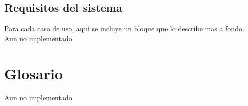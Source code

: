 \documentclass[a4paper, spanish]{article}
\begin{document}
\subsection{Requisitos del sistema}
Para cada caso de uso, aqui se incluye un bloque que lo describe mas a fondo.
\newcommand{\CasoDeUso}[1]{Aun no implementado}
\CasoDeUso{%
	identificador          = {...},
	autor/modificacion     = {...},
	fecha                  = {...},
	actores involucrados   = {...},
	resumen                = {...},
	pre condiciones        = {...},
	post condiciones       = {...},
	usuario                = {...},
	sistema                = {...},
	caminos alternativos   = {...},
	clases involucradas    = {...},
}

\section{Glosario}
\newcommand{\Glosario}[1]{Aun no implementado}
\Glosario{%
	Termino 1 = {Definicion 1},
	Termino 2 = {Definicion 2},
	Termino 3 = {Definicion 3},
}
\end{document}
